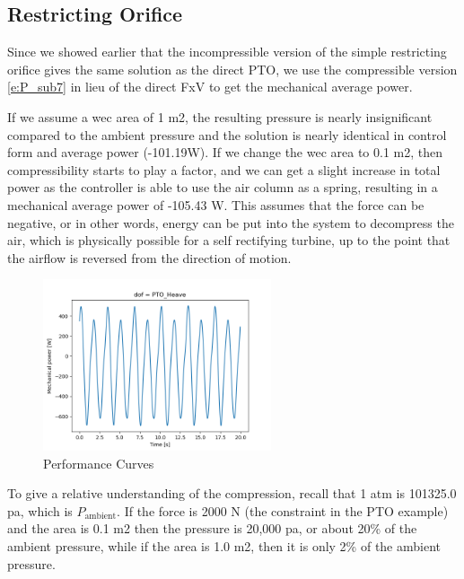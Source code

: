 \documentclass[conf]{new-aiaa}
\begin{document}
\subsection{Restricting Orifice}

Since we showed earlier that the incompressible version of the simple restricting orifice gives the same solution as the direct PTO, we use the compressible version \cref{e:P_sub7} in lieu of the direct FxV to get the mechanical average power.  

If we assume a wec area of 1 m2, the resulting pressure is nearly insignificant compared to the ambient pressure and the solution is nearly identical in control form and average power (-101.19W).  If we change the wec area to 0.1 m2, then compressibility starts to play a factor, and we can get a slight increase in total power as the controller is able to use the air column as a spring, resulting in a mechanical average power of -105.43 W. This assumes that the force can be negative, or in other words, energy can be put into the system to decompress the air, which is physically possible for a self rectifying turbine, up to the point that the airflow is reversed from the direction of motion.

\begin{figure}[H]
\centering
\vspace{-6pt}
\includegraphics[trim={0.0cm 0cm 0cm 0cm},clip,width=0.6\textwidth]{choke_1.png}
\vspace{-6pt}
\caption{Performance Curves}
\label{fig:choke_1}
\end{figure}

To give a relative understanding of the compression, recall that 1 atm is 101325.0 pa, which is $P_\text{ambient}$.  If the force is 2000 N (the constraint in the PTO example) and the area is 0.1 m2 then the pressure is 20,000 pa, or about 20\% of the ambient pressure, while if the area is 1.0 m2, then it is only 2\% of the ambient pressure.
\end{document}

